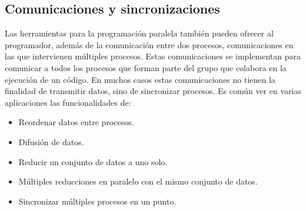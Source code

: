 \subsection{Comunicaciones y sincronizaciones}
Las herramientas para la programación paralela también pueden ofrecer al programador, además de la comunicación entre dos procesos, comunicaciones en las que intervienen múltiples procesos. Estas comunicaciones se implementan para comunicar a todos los procesos que forman parte del grupo que colabora en la ejecución de un código. En muchos casos estas comunicaciones no tienen la finalidad de transmitir datos, sino de sincronizar procesos. Es común ver en varias aplicaciones las funcionalidades de:
\begin{itemize}
    \item Reordenar datos entre procesos.
    \item Difusión de datos.
    \item Reducir un conjunto de datos a uno solo.
    \item Múltiples reducciones en paralelo con el mismo conjunto de datos.
    \item Sincronizar múltiples procesos en un punto.
\end{itemize}

